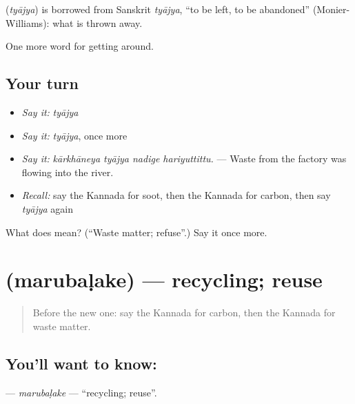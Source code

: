 \begin{cousinweb}
\textbf{} (\emph{tyājya}) is borrowed from Sanskrit \emph{tyājya}, \textquotedblleft{}to be left, to be abandoned\textquotedblright{} (Monier-Williams): what is thrown away.
\end{cousinweb}

\begin{grammarlens}[title={What you've built}]
One more word for getting around.
\end{grammarlens}

\subsection*{Your turn}
\begin{itemize}
\raggedright
  \item \emph{Say it:} \emph{tyājya}
  \item \emph{Say it:} \emph{tyājya}, once more
  \item \emph{Say it:} \emph{kārkhāneya tyājya nadige hariyuttittu.} — Waste from the factory was flowing into the river.
  \item \emph{Recall:} say the Kannada for soot, then the Kannada for carbon, then say \emph{tyājya} again
\end{itemize}

\begin{tcolorbox}[breakable,colback=teal!4,colframe=teal!35!black,title={Before you move on}]
What does  mean? (\textquotedblleft{}Waste matter; refuse\textquotedblright{}.) Say it once more.
\end{tcolorbox}
\section[\texorpdfstring{\kn{ಮರುಬಳಕೆ} (marubaḷake)}{ಮರುಬಳಕೆ (marubaḷake)}]{ (marubaḷake) — recycling; reuse}

\label{lesson:KA-C474-marubalake}



\begin{quote}
Before the new one: say the Kannada for carbon, then the Kannada for waste matter.
\end{quote}

\subsection*{You'll want to know: }
\textbf{} — \emph{marubaḷake} — \textquotedblleft{}recycling; reuse\textquotedblright{}.


